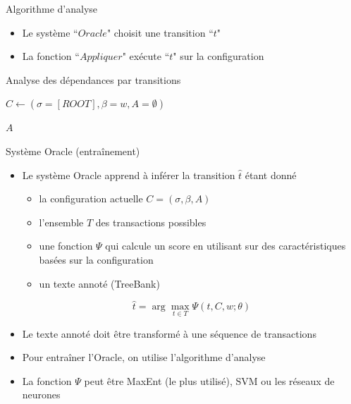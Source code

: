 \documentclass{KodeBook}
\begin{document}
Algorithme d'analyse
\begin{itemize}
	\item Le système ``$Oracle$" choisit une transition ``$t$"
	\item La fonction ``$Appliquer$" exécute ``$t$" sur la configuration
\end{itemize}

\begin{block}{Analyse des dépendances par transitions}
	\begin{algorithm}[H]
		
		$C \leftarrow (\sigma=[ROOT], \beta = w, A = \emptyset)$\;
		
		
		
		\Retour $A$ \;
	\end{algorithm}
\end{block}

Système Oracle (entraînement)
\begin{itemize}
	\item Le système Oracle apprend à inférer la transition $\hat{t}$ étant donné
	\begin{itemize}
		\item la configuration actuelle $ C = (\sigma, \beta, A) $
		\item l'ensemble $T$ des transactions possibles
		\item une fonction $\Psi$ qui calcule un score en utilisant sur des caractéristiques basées sur la configuration 
		\item un texte annoté (TreeBank)
	\end{itemize}
	\[ \hat{t} = \arg\max\limits_{t \in T} \Psi (t, C, w; \theta) \]
	
	\item Le texte annoté doit être transformé à une séquence de transactions
	\item Pour entraîner l'Oracle, on utilise l'algorithme d'analyse 
	\item La fonction $\Psi$ peut être MaxEnt (le plus utilisé), SVM ou les réseaux de neurones
\end{itemize}
\end{document}
